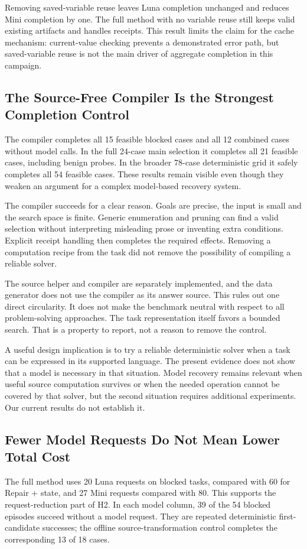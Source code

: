 \documentclass[conference]{IEEEtran}
\begin{document}
Removing saved-variable reuse leaves Luna completion unchanged and reduces Mini completion by one. The full method with no variable reuse still keeps valid existing artifacts and handles receipts. This result limits the claim for the cache mechanism: current-value checking prevents a demonstrated error path, but saved-variable reuse is not the main driver of aggregate completion in this campaign.

\subsection{The Source-Free Compiler Is the Strongest Completion Control}
The compiler completes all 15 feasible blocked cases and all 12 combined cases without model calls. In the full 24-case main selection it completes all 21 feasible cases, including benign probes. In the broader 78-case deterministic grid it safely completes all 54 feasible cases. These results remain visible even though they weaken an argument for a complex model-based recovery system.

The compiler succeeds for a clear reason. Goals are precise, the input is small and the search space is finite. Generic enumeration and pruning can find a valid selection without interpreting misleading prose or inventing extra conditions. Explicit receipt handling then completes the required effects. Removing a computation recipe from the task did not remove the possibility of compiling a reliable solver.

The source helper and compiler are separately implemented, and the data generator does not use the compiler as its answer source. This rules out one direct circularity. It does not make the benchmark neutral with respect to all problem-solving approaches. The task representation itself favors a bounded search. That is a property to report, not a reason to remove the control.

A useful design implication is to try a reliable deterministic solver when a task can be expressed in its supported language. The present evidence does not show that a model is necessary in that situation. Model recovery remains relevant when useful source computation survives or when the needed operation cannot be covered by that solver, but the second situation requires additional experiments. Our current results do not establish it.

\subsection{Fewer Model Requests Do Not Mean Lower Total Cost}
The full method uses 20 Luna requests on blocked tasks, compared with 60 for Repair + state, and 27 Mini requests compared with 80. This supports the request-reduction part of H2. In each model column, 39 of the 54 blocked episodes succeed without a model request. They are repeated deterministic first-candidate successes; the offline source-transformation control completes the corresponding 13 of 18 cases.
\end{document}
